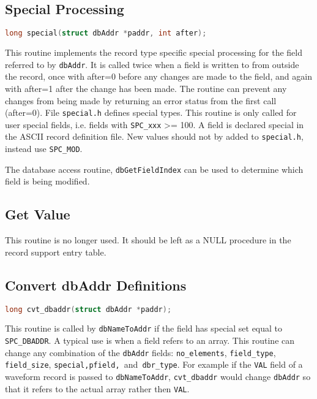 \subsection{Special Processing}

\begin{lstlisting}[language=C]
long special(struct dbAddr *paddr, int after);
\end{lstlisting}

This routine implements the record type specific special processing for the field referred to by \verb|dbAddr|.
It is called twice when a field is written to from outside the record, once with after=0 before any changes are made to the field, and again with after=1 after the change has been made.
The routine can prevent any changes from being made by returning an error status from the first call (after=0).
File \verb|special.h| defines special types.
This routine is only called for user special fields, i.e. fields with \verb|SPC_xxx| \textgreater{}= 100.
A field is declared special in the ASCII record definition file.
New values should not by added to \verb|special.h|, instead use \verb|SPC_MOD|.

The database access routine, \verb|dbGetFieldIndex| can be used to determine which field is being modified.

\subsection{Get Value}

This routine is no longer used.
It should be left as a NULL procedure in the record support entry table.

\subsection{Convert dbAddr Definitions}

\begin{lstlisting}[language=C]
long cvt_dbaddr(struct dbAddr *paddr);
\end{lstlisting}

This routine is called by \verb|dbNameToAddr| if the field has special set equal to \verb|SPC_DBADDR|.
A typical use is when a field refers to an array.
This routine can change any combination of the \verb|dbAddr| fields:
\verb|no_elements|, \verb|field_type|, \verb|field_size|, \verb|special,pfield, |and\verb| dbr_type|.
For example if the \verb|VAL| field of a waveform record is passed to \verb|dbNameToAddr|, \verb|cvt_dbaddr| would change \verb|dbAddr| so that it refers to the actual array rather then \verb|VAL|.

